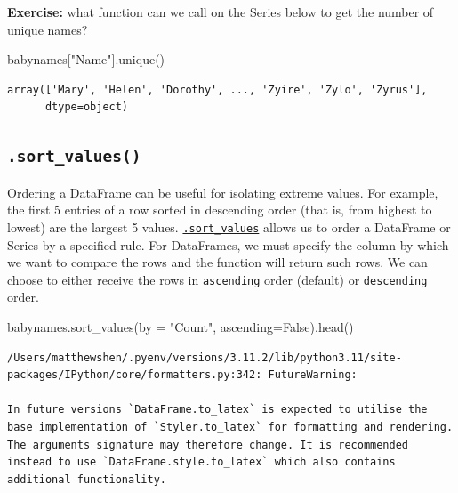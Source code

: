 \documentclass[
  letterpaper,
  DIV=11,
  numbers=noendperiod]{scrreprt}
\newenvironment{Shaded}{\begin{snugshade}}{\end{snugshade}}
\newcommand{\NormalTok}[1]{\textcolor[rgb]{0.00,0.23,0.31}{#1}}
\newcommand{\OperatorTok}[1]{\textcolor[rgb]{0.37,0.37,0.37}{#1}}
\newcommand{\StringTok}[1]{\textcolor[rgb]{0.13,0.47,0.30}{#1}}
\newcommand{\VariableTok}[1]{\textcolor[rgb]{0.07,0.07,0.07}{#1}}
\begin{document}
\textbf{Exercise:} what function can we call on the Series below to get
the number of unique names?

\begin{Shaded}
\begin{Highlighting}[]
\NormalTok{babynames[}\StringTok{"Name"}\NormalTok{].unique()}
\end{Highlighting}
\end{Shaded}

\begin{verbatim}
array(['Mary', 'Helen', 'Dorothy', ..., 'Zyire', 'Zylo', 'Zyrus'],
      dtype=object)
\end{verbatim}

\hypertarget{sort_values}{%
\subsection{\texorpdfstring{\texttt{.sort\_values()}}{.sort\_values()}}\label{sort_values}}

Ordering a DataFrame can be useful for isolating extreme values. For
example, the first 5 entries of a row sorted in descending order (that
is, from highest to lowest) are the largest 5 values.
\href{https://pandas.pydata.org/docs/reference/api/pandas.DataFrame.sort_values.html}{\texttt{.sort\_values}}
allows us to order a DataFrame or Series by a specified rule. For
DataFrames, we must specify the column by which we want to compare the
rows and the function will return such rows. We can choose to either
receive the rows in \texttt{ascending} order (default) or
\texttt{descending} order.

\begin{Shaded}
\begin{Highlighting}[]
\NormalTok{babynames.sort\_values(by }\OperatorTok{=} \StringTok{"Count"}\NormalTok{, ascending}\OperatorTok{=}\VariableTok{False}\NormalTok{).head()}
\end{Highlighting}
\end{Shaded}

\begin{verbatim}
/Users/matthewshen/.pyenv/versions/3.11.2/lib/python3.11/site-packages/IPython/core/formatters.py:342: FutureWarning:

In future versions `DataFrame.to_latex` is expected to utilise the base implementation of `Styler.to_latex` for formatting and rendering. The arguments signature may therefore change. It is recommended instead to use `DataFrame.style.to_latex` which also contains additional functionality.
\end{verbatim}
\end{document}
